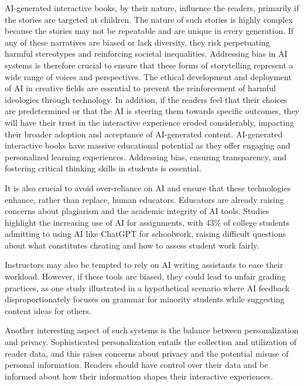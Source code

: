 \documentclass[conference]{IEEEtran}
\begin{document}
	AI-generated interactive books, by their nature, influence the readers, primarily if the stories are targeted at children\cite{salazar2024generative}. The nature of such stories is highly complex because the stories may not be repeatable and are unique in every generation.   If any of these narratives are biased or lack diversity, they risk perpetuating harmful stereotypes and reinforcing societal inequalities. Addressing bias in AI systems is therefore crucial to ensure that these forms of storytelling represent a wide range of voices and perspectives. The ethical development and deployment of AI in creative fields are essential to prevent the reinforcement of harmful ideologies through technology. In addition, if the readers feel that their choices are predetermined or that the AI is steering them towards specific outcomes, they will have their trust in the interactive experience eroded considerably, impacting their broader adoption and acceptance of AI-generated content. AI-generated interactive books have massive educational potential as they offer engaging and personalized learning experiences. Addressing bias, ensuring transparency, and fostering critical thinking skills in students is essential. 
	
	It is also crucial to avoid over-reliance on AI and ensure that these technologies enhance, rather than replace, human educators\cite{salazar2024generative}. Educators are already raising concerns about plagiarism and the academic integrity of AI tools. Studies\cite{delello2023exploring} highlight the increasing use of AI for assignments, with 43\% of college students admitting to using AI like ChatGPT for schoolwork, raising difficult questions about what constitutes cheating and how to assess student work fairly.
	
	Instructors may also be tempted to rely on AI writing assistants to ease their workload. However, if these tools are biased, they could lead to unfair grading practices, as one study illustrated in a hypothetical scenario where AI feedback disproportionately focuses on grammar for minority students while suggesting content ideas for others\cite{salazar2024generative}.
	
	Another interesting aspect of such systems is the balance between personalization and privacy\cite{kutty2021personalization}. Sophisticated personalization entails the collection and utilization of reader data, and this raises concerns about privacy and the potential misuse of personal information. Readers should have control over their data and be informed about how their information shapes their interactive experiences.
	
\end{document}
